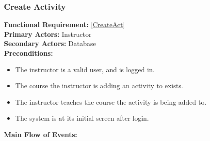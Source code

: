 \documentclass{article}
\begin{document}
\subsubsection{Create Activity}
\textbf{Functional Requirement:} \ref{CreateAct} \\
\textbf{Primary Actors:} Instructor \\
\textbf{Secondary Actors:} Database \\
\textbf{Preconditions:}
\begin{itemize}
	\item The instructor is a valid user, and is logged in.
	\item The course the instructor is adding an activity to exists.
	\item The instructor teaches the course the activity is being added to.
	\item The system is at its initial screen after login.
\end{itemize}
\textbf{Main Flow of Events:}
\end{document}
